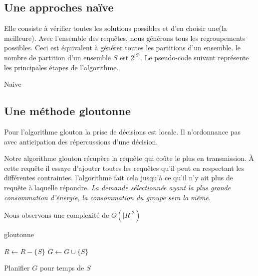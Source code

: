 \documentclass[runningheads]{llncs}
\begin{document}
\subsection{Une approches na\"ive }
Elle consiste à vérifier toutes les solutions possibles et d'en choisir une(la meilleure).
Avec l'ensemble des requêtes, nous générons tous les regroupements possibles.
Ceci est équivalent à générer toutes les partitions d'un ensemble.
le nombre de partition d'un ensemble $S$ est $2^{|S|}$.
Le pseudo-code suivant représente les principales étapes de l'algorithme.
\begin{algorithm}[H]
    \caption{Naive}%
    \label{alg:naive}
    \begin{algorithmic}[1]
        \EndFor{}
        
    
    \end{algorithmic}
\end{algorithm}


  
\subsection{Une m\'ethode gloutonne}
Pour l'algorithme glouton la prise de décisions  est locale. 
Il n'ordonnance pas avec anticipation des répercussions d'une décision.

Notre algorithme glouton récupère la requête qui coûte le plus en transmission.
À cette requête il essaye d'ajouter toutes les requêtes qu'il peut en respectant 
les différentes contraintes. 
l'algorithme fait cela jusqu'à ce qu'il n'y ait plus de requête à laquelle répondre.
\emph{La demande sélectionnée ayant la plus grande consommation d'énergie, 
la consommation du groupe sera la même.}

Nous observons une complexité  de $O(|R|^2)$
\begin{algorithm}[H]
    \caption{gloutonne}%
    \label{alg:greedy}
    \begin{algorithmic}[1]
        \State $ R \gets R - \{S\}$
        \State $ G \gets G \cup \{S\}$
      
          \EndIf{}
       \EndFor{}
       Planifier $G$ pour temps de $S$
      \EndWhile{}
    \end{algorithmic}
  \end{algorithm}
\end{document}
